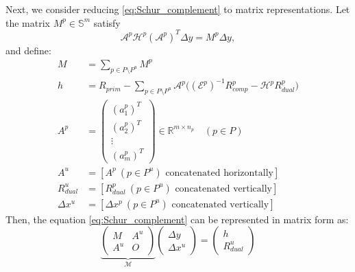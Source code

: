 Next, we consider reducing \eqref{eq:Schur_complement} to matrix representations. 
Let the matrix $M^p \in \mathbb{S}^{m}$ satisfy
\[
    \mathcal{A}^p\mathcal{H}^p(\mathcal{A}^p)^T \Delta y= M^p \Delta y,
\]
and define:
\begin{align*}
    M &= \sum_{p \in P \setminus P^u} M^p \\
    h &= R_{prim} - \sum_{p \in P \setminus P^u} \mathcal{A}^p\big((\mathcal{E}^p)^{-1}R_{comp}^p - \mathcal{H}^p R_{dual}^p\big)\\
    A^p &= \begin{pmatrix}
        (a^p_1)^T\\
        (a^p_2)^T\\
        \vdots\\
        (a^p_m)^T
    \end{pmatrix} \in \mathbb{R}^{m\times n_p} \quad (p\in P)\\
    A^u &= [ A^p ~ (p\in P^u)\text{ concatenated horizontally} ]\\
    R^u_{dual} &= [ R^p_{dual} ~ (p\in P^u)\text{ concatenated vertically} ]\\
    \Delta x^u &= [ \Delta x^p ~ (p\in P^u)\text{ concatenated vertically} ]
\end{align*}
Then, the equation \eqref{eq:Schur_complement} can be represented in matrix form as:
\begin{equation}
    \underbrace{\left(\begin{array}{cc}
        M   & A^u \\
        A^u & O
    \end{array}\right)}_{\mathcal{M}}
    \left(\begin{array}{c}
        \Delta y   \\
        \Delta x^u 
    \end{array}\right) 
    = 
    \left(\begin{array}{c}
         h  \\
         R_{dual}^u 
    \end{array}
    \right)
    \label{eq:Schur_complement_Mat}
\end{equation}

